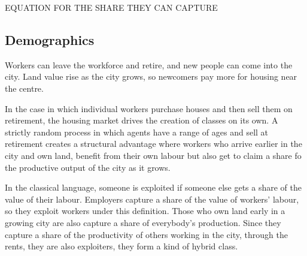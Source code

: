 
EQUATION FOR THE SHARE THEY CAN CAPTURE


\subsection{Demographics}

Workers can leave the workforce and retire, and new people can come into the city. Land value rise as the city grows, so newcomers pay more for housing near the centre.

In the case in which individual workers purchase houses and then sell them on retirement, the housing market drives the creation of classes on its own. A strictly random process in which agents have a range of ages and sell at retirement creates a structural advantage where workers who arrive earlier in the city and own land, benefit from their own labour but also get to claim a share fo the productive output of the city as it grows. %

In the classical language, someone is exploited if someone else gets a share of the value of their labour. %
 Employers capture a share of the value of workers' labour, so they exploit workers under this definition.
Those who own land early in a growing city are also capture a share of everybody's production. Since they capture a share of the productivity of others working in the city, through the rents, they are also exploiters, they form a kind of hybrid class. %

